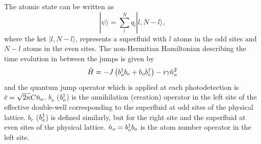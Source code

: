 The atomic state can be written as
\begin{equation}
  \label{eq:discretepsi}
  | \psi \rangle = \sum_l^N q_l |l, N - l \rangle,
\end{equation}
where the ket $| l, N - l \rangle$, represents a superfluid with $l$
atoms in the odd sites and $N-l$ atoms in the even sites. The
non-Hermitian Hamiltonian describing the time evolution in between the
jumps is given by
\begin{equation}
  \label{eq:doublewell}
  \hat{H} = -J \left( b^\dagger_o b_e + b_o b^\dagger_e \right) - i
  \gamma \hat{n}_o^2
\end{equation}
and the quantum jump operator which is applied at each photodetection
is $\hat{c} = \sqrt{2 \kappa} C \hat{n}_o$. $b_o$ ($b^\dagger_o$) is the annihilation
(creation) operator in the left site of the effective double-well
corresponding to the superfluid at odd sites of the physical
lattice. $b_e$ ($b^\dagger_e$) is defined similarly, but for the right site
and the superfluid at even sites of the physical lattice.
$\hat{n}_o = b^\dagger_o b_o$ is the atom number operator in the left site.

